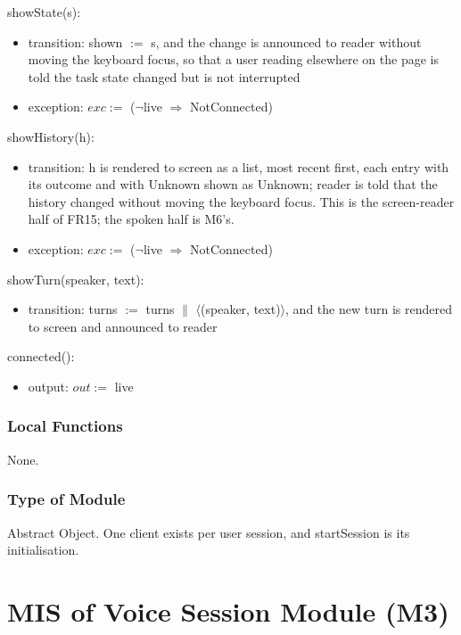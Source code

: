 \documentclass[12pt, titlepage]{article}
\begin{document}
\noindent showState(s):
\begin{itemize}
\item transition: shown $:=$ s, and the change is announced to reader without
moving the keyboard focus, so that a user reading elsewhere on the page is told
the task state changed but is not interrupted
\item exception: $exc :=$ ($\lnot$live $\Rightarrow$ NotConnected)
\end{itemize}

\noindent showHistory(h):
\begin{itemize}
\item transition: h is rendered to screen as a list, most recent first, each
entry with its outcome and with Unknown shown as Unknown; reader is told that the
history changed without moving the keyboard focus. This is the screen-reader
half of FR15; the spoken half is M6's.
\item exception: $exc :=$ ($\lnot$live $\Rightarrow$ NotConnected)
\end{itemize}

\noindent showTurn(speaker, text):
\begin{itemize}
\item transition: turns $:=$ turns $\|$ $\langle$(speaker, text)$\rangle$, and
the new turn is rendered to screen and announced to reader
\end{itemize}

\noindent connected():
\begin{itemize}
\item output: $out :=$ live
\end{itemize}

\subsubsection{Local Functions}

None.

\subsubsection{Type of Module}

Abstract Object. One client exists per user session, and startSession is its
initialisation.

\newpage

\section{MIS of Voice Session Module (M3)} \label{mod:voice}
\end{document}
